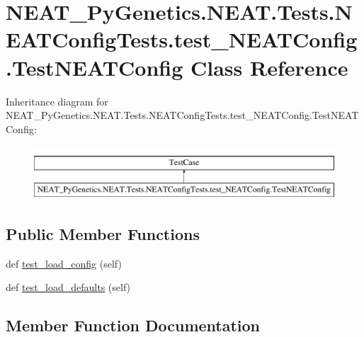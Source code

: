 \hypertarget{classNEAT__PyGenetics_1_1NEAT_1_1Tests_1_1NEATConfigTests_1_1test__NEATConfig_1_1TestNEATConfig}{}\section{N\+E\+A\+T\+\_\+\+Py\+Genetics.\+N\+E\+A\+T.\+Tests.\+N\+E\+A\+T\+Config\+Tests.\+test\+\_\+\+N\+E\+A\+T\+Config.\+Test\+N\+E\+A\+T\+Config Class Reference}
\label{classNEAT__PyGenetics_1_1NEAT_1_1Tests_1_1NEATConfigTests_1_1test__NEATConfig_1_1TestNEATConfig}
Inheritance diagram for N\+E\+A\+T\+\_\+\+Py\+Genetics.\+N\+E\+A\+T.\+Tests.\+N\+E\+A\+T\+Config\+Tests.\+test\+\_\+\+N\+E\+A\+T\+Config.\+Test\+N\+E\+A\+T\+Config\+:\begin{figure}[H]
\begin{center}
\leavevmode
\includegraphics[height=2.000000cm]{classNEAT__PyGenetics_1_1NEAT_1_1Tests_1_1NEATConfigTests_1_1test__NEATConfig_1_1TestNEATConfig}
\end{center}
\end{figure}
\subsection*{Public Member Functions}
\begin{DoxyCompactItemize}
\item 
def \hyperlink{classNEAT__PyGenetics_1_1NEAT_1_1Tests_1_1NEATConfigTests_1_1test__NEATConfig_1_1TestNEATConfig_af0a8dbda0ccd83925dc128d89eda15d1}{test\+\_\+load\+\_\+config} (self)
\item 
def \hyperlink{classNEAT__PyGenetics_1_1NEAT_1_1Tests_1_1NEATConfigTests_1_1test__NEATConfig_1_1TestNEATConfig_af2a32fc9eb41393f00eebc5cee9e04b1}{test\+\_\+load\+\_\+defaults} (self)
\end{DoxyCompactItemize}


\subsection{Member Function Documentation}
